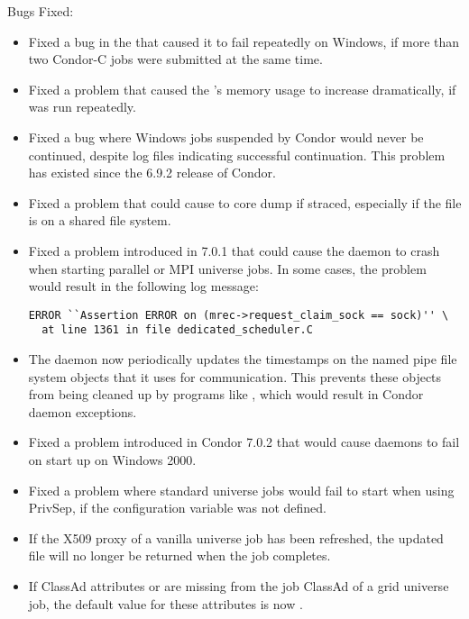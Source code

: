 \noindent Bugs Fixed:

\begin{itemize}

\item Fixed a bug in the  that caused it to fail repeatedly
on Windows, if more than two Condor-C jobs were submitted at the same time.

\item Fixed a problem that caused the 's memory usage
to increase dramatically, if  was run repeatedly.

\item Fixed a bug where Windows jobs suspended by Condor would never
be continued, despite log files indicating successful continuation.
This problem has existed since the 6.9.2 release of Condor.

\item Fixed a problem that could cause  to core dump
if straced, especially if the  file is on a shared
file system.

\item Fixed a problem introduced in 7.0.1 that could cause the 
daemon to crash when starting parallel or MPI universe jobs.  In some cases,
the problem would result in the following log message:

\footnotesize
\begin{verbatim}
ERROR ``Assertion ERROR on (mrec->request_claim_sock == sock)'' \
  at line 1361 in file dedicated_scheduler.C
\end{verbatim}
\normalsize

\item The  daemon now periodically updates the timestamps on
the named pipe file system objects that it uses for communication.
This prevents these objects from being cleaned up by programs like
\Prog{tmpwatch}, which would result in Condor daemon exceptions.

\item Fixed a problem introduced in Condor 7.0.2 that would cause daemons
to fail on start up on Windows 2000.

\item Fixed a problem where standard universe jobs would fail to start
when using PrivSep, if the \Macro{PROCD\_ADDRESS} configuration variable was not
defined.

\item If the X509 proxy of a vanilla universe job has been refreshed, the
updated file will no longer be returned when the job completes.

\item If ClassAd attributes  or  are
missing from the job ClassAd of a grid universe job,
the default value for these attributes is now .

\end{itemize}

